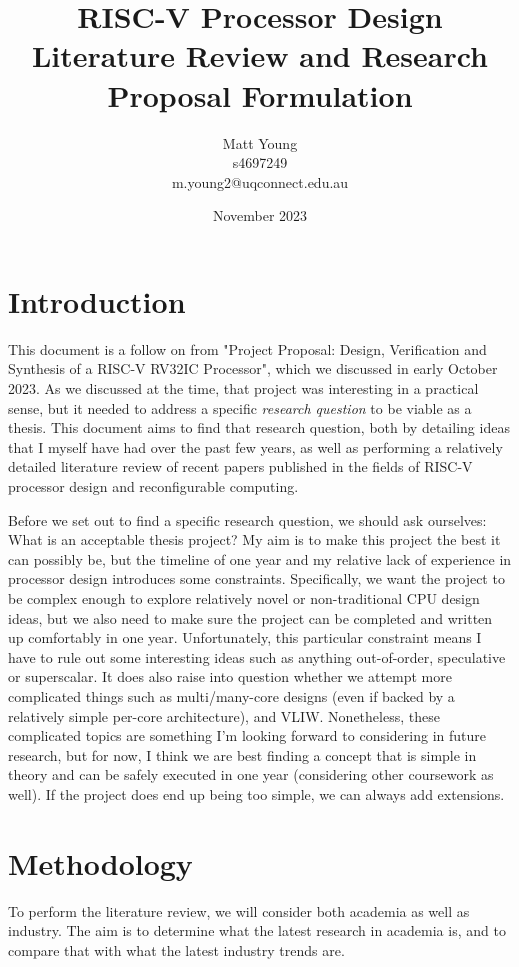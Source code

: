 \documentclass[12pt]{article}
\title{\textbf{RISC-V Processor Design Literature Review and Research Proposal Formulation}}
\author{Matt Young \\ s4697249 \\ m.young2@uqconnect.edu.au}
\date{November 2023}
\begin{document}
\maketitle

\tableofcontents

\section{Introduction}
This document is a follow on from 
"Project Proposal: Design, Verification and Synthesis of a RISC-V RV32IC Processor", which we discussed
in early October 2023. As we discussed at the time, that project was interesting in a practical sense, but it 
needed to address a specific \textit{research question} to be viable as a thesis. This document aims to find 
that research question, both by detailing ideas that I myself have had over the past few years, as well as
performing a relatively detailed literature review of recent papers published in the fields of RISC-V
processor design and reconfigurable computing.

Before we set out to find a specific research question, we should ask ourselves: What is an acceptable thesis
project? My aim is to make this project the best it can possibly be, but the timeline of one year and my
relative lack of experience in processor design introduces some constraints. Specifically, we want the project
to be complex enough to explore relatively novel or non-traditional CPU design ideas, but we also need to make
sure the project can be completed and written up comfortably in one year. Unfortunately, this particular
constraint means I have to rule out some interesting ideas such as anything out-of-order, speculative or
superscalar. It does also raise into question whether we attempt more complicated things such as multi/many-core
designs (even if backed by a relatively simple per-core architecture), and VLIW. Nonetheless, these complicated
topics are something I'm looking forward to considering in future research, but for now, I think we are best
finding a concept that is simple in theory and can be safely executed in one year (considering other coursework
as well). If the project does end up being too simple, we can always add extensions.

\section{Methodology}
To perform the literature review, we will consider both academia as well as industry. The aim is to determine
what the latest research in academia is, and to compare that with what the latest industry trends are.
\end{document}
